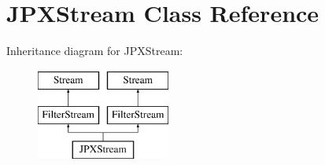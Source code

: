 \hypertarget{class_j_p_x_stream}{}\section{J\+P\+X\+Stream Class Reference}
\label{class_j_p_x_stream}
Inheritance diagram for J\+P\+X\+Stream\+:\begin{figure}[H]
\begin{center}
\leavevmode
\includegraphics[height=3.000000cm]{class_j_p_x_stream}
\end{center}
\end{figure}
